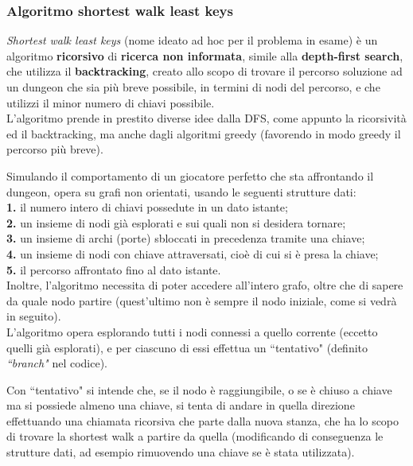 \documentclass[12pt,titlepage]{article}
\begin{document}
\subsubsection {Algoritmo shortest walk least keys}

\textit{Shortest walk least keys} (nome ideato ad hoc per il problema in esame) è un algoritmo \textbf{ricorsivo} di \textbf{ricerca non informata}, simile alla \textbf{depth-first search}, che utilizza il \textbf{backtracking}, creato allo scopo di trovare il percorso soluzione ad un dungeon che sia più breve possibile, in termini di nodi del percorso, e che utilizzi il minor numero di chiavi possibile.\\

\noindent L'algoritmo prende in prestito diverse idee dalla DFS, come appunto la ricorsività ed il backtracking, ma anche dagli algoritmi greedy (favorendo in modo greedy il percorso più breve).

Simulando il comportamento di un giocatore perfetto che sta affrontando il dungeon, opera su grafi non orientati, usando le seguenti strutture dati:\\
\textbf{1.} il numero intero di chiavi possedute in un dato istante;\\
\textbf{2.} un insieme di nodi già esplorati e sui quali non si desidera tornare;\\
\textbf{3.} un insieme di archi (porte) sbloccati in precedenza tramite una chiave;\\
\textbf{4.} un insieme di nodi con chiave attraversati, cioè di cui si è presa la chiave;\\
\textbf{5.} il percorso affrontato fino al dato istante.\\
Inoltre, l'algoritmo necessita di poter accedere all'intero grafo, oltre che di sapere da quale nodo partire (quest'ultimo non è sempre il nodo iniziale, come si vedrà in seguito).\\

\noindent L'algoritmo opera esplorando tutti i nodi connessi a quello corrente (eccetto quelli già esplorati), e per ciascuno di essi effettua un ``tentativo" (definito \textit{``branch"} nel codice).

Con ``tentativo" si intende che, se il nodo è raggiungibile, o se è chiuso a chiave ma si possiede almeno una chiave, si tenta di andare in quella direzione effettuando una chiamata ricorsiva che parte dalla nuova stanza, che ha lo scopo di trovare la shortest walk a partire da quella (modificando di conseguenza le strutture dati, ad esempio rimuovendo una chiave se è stata utilizzata).
\end{document}
